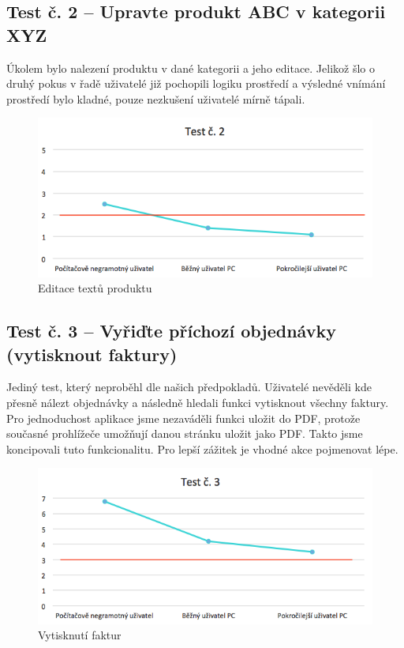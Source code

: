 \documentclass[11pt,a4paper]{article}
\begin{document}
\subsection*{Test č. 2 -- Upravte produkt ABC v kategorii XYZ}
Úkolem bylo nalezení produktu v dané kategorii a jeho editace. Jelikož šlo o druhý pokus v řadě uživatelé již pochopili logiku prostředí a výsledné vnímání prostředí bylo kladné, pouze nezkušení uživatelé mírně tápali.

\begin{figure}[t]
    \centering
    \includegraphics[width=\textwidth]{t2.png}
    \caption{Editace textů produktu}
\end{figure}

\subsection*{Test č. 3 -- Vyřiďte příchozí objednávky (vytisknout faktury)}
Jediný test, který neproběhl dle našich předpokladů. Uživatelé nevěděli kde přesně nálezt objednávky a následně hledali funkci vytisknout všechny faktury. Pro jednoduchost aplikace jsme nezaváděli funkci uložit do PDF, protože současné prohlížeče umožňují danou stránku uložit jako PDF. Takto jsme koncipovali tuto funkcionalitu. Pro lepší zážitek je vhodné akce pojmenovat lépe.

\begin{figure}[!ht]
    \centering
    \includegraphics[width=\textwidth]{t3.png}
    \caption{Vytisknutí faktur}
\end{figure}
\newpage
\end{document}
